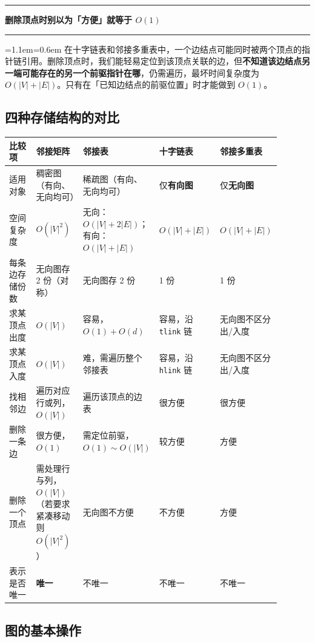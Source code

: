 \documentclass[11pt,openany,UTF8]{ctexbook}
\newcommand{\callouthead}[2]{%
  \par\addvspace{7pt}\noindent
  {\color{#1}\rule[-0.15em]{3pt}{1.05em}}\hspace{0.5em}%
  {\bfseries\color{#1}#2}\par\nobreak\vspace{-0.35em}%
  {\color{rulesep}\hrule height 0.4pt}\nobreak\vspace{0.45em}%
  \begingroup\small\setlength{\parindent}{0pt}%
  \leftskip=1.1em\rightskip=0.6em\noindent\ignorespaces}
\newcommand{\calloutend}{\par\endgroup\addvspace{7pt}}
\newenvironment{callwarn}[1]{\callouthead{warnbar}{#1}}{\calloutend}
\begin{document}
\begin{callwarn}{删除顶点时别以为「方便」就等于 $O(1)$}
在十字链表和邻接多重表中，一个边结点可能同时被两个顶点的指针链引用。删除顶点时，我们能轻易定位到该顶点关联的边，但\textbf{不知道该边结点另一端可能存在的另一个前驱指针在哪}，仍需遍历，最坏时间复杂度为 $O(|V|+|E|)$。只有在「已知边结点的前驱位置」时才能做到 $O(1)$。

\end{callwarn}

\subsection{四种存储结构的对比}

\begingroup\small\setlength{\tabcolsep}{4.0pt}
\begin{longtable}{@{}L{0.1741\linewidth}L{0.2009\linewidth}L{0.2210\linewidth}L{0.1574\linewidth}L{0.1407\linewidth}@{}}
\toprule
\textbf{比较项} & \textbf{邻接矩阵} & \textbf{邻接表} & \textbf{十字链表} & \textbf{邻接多重表} \\
\midrule
\endhead
适用对象 & 稠密图（有向、无向均可） & 稀疏图（有向、无向均可） & 仅\textbf{有向图} & 仅\textbf{无向图} \\
空间复杂度 & $O(\lvert V\rvert^{2})$ & 无向：$O(\lvert V\rvert+2\lvert E\rvert)$；有向：$O(\lvert V\rvert+\lvert E\rvert)$ & $O(\lvert V\rvert+\lvert E\rvert)$ & $O(\lvert V\rvert+\lvert E\rvert)$ \\
每条边存储份数 & 无向图存 2 份（对称） & 无向图存 2 份 & 1 份 & 1 份 \\
求某顶点出度 & $O(\lvert V\rvert)$ & 容易，$O(1)+O(d)$ & 容易，沿 \texttt{tlink} 链 & 无向图不区分出/入度 \\
求某顶点入度 & $O(\lvert V\rvert)$ & 难，需遍历整个邻接表 & 容易，沿 \texttt{hlink} 链 & 无向图不区分出/入度 \\
找相邻边 & 遍历对应行或列，$O(\lvert V\rvert)$ & 遍历该顶点的边表 & 很方便 & 很方便 \\
删除一条边 & 很方便，$O(1)$ & 需定位前驱，$O(1)\sim O(\lvert V\rvert)$ & 较方便 & 方便 \\
删除一个顶点 & 需处理行与列，$O(\lvert V\rvert)$（若要求紧凑移动则 $O(\lvert V\rvert^{2})$） & 无向图不方便 & 不方便 & 方便 \\
表示是否唯一 & \textbf{唯一} & 不唯一 & 不唯一 & 不唯一 \\
\bottomrule
\end{longtable}
\endgroup

\subsection{图的基本操作}
\end{document}
